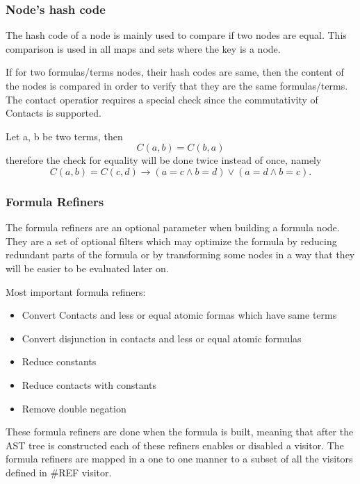 \documentclass{article}
\begin{document}
		\subsubsection*{Node's hash code}
			The hash code of a node is mainly used to compare if two nodes are equal. 
			This comparison is used in all maps and sets where the key is a node. 
			
			If for two formulas/terms nodes, their hash codes are same, then the content of the nodes is 
			compared in order to verify that they are the same formulas/terms.
			\newline
			The contact operatior requires a special check since the commutativity of Contacts is supported.
			\newline

			Let a, b be two terms, then
			\begin{equation}
				C(a, b) = C(b, a)
			\end{equation}
			therefore the check for equality will be done twice instead of once, namely
			\begin{equation}
				 C(a, b) = C(c, d) \rightarrow (a = c \wedge b = d) \vee (a = d \wedge b = c).
			\end{equation}
		
		\subsubsection{Formula Refiners}
			The formula refiners are an optional parameter when building a formula node.
			They are a set of optional filters which may optimize the formula by reducing redundant parts of the 
			formula or by transforming some nodes in a way that they will be easier to be evaluated later on.
			
			Most important formula refiners:
			\begin{itemize}
				\item Convert Contacts and less or equal atomic formas which have same terms
				\item Convert disjunction in contacts and less or equal atomic formulas
				\item Reduce constants
				\item Reduce contacts with constants
				\item Remove double negation
			\end{itemize}

			These formula refiners are done when the formula is built, meaning that after the 
			AST tree is constructed each of these refiners enables or disabled a visitor. 
			The formula refiners are mapped in a one to one manner to a subset of all the visitors defined 
			in \#REF visitor.
\end{document}
